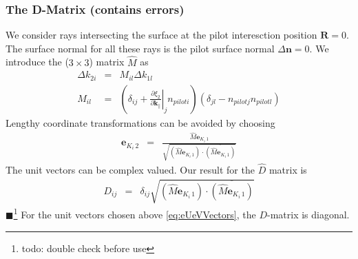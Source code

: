 \documentclass[12pt,a4paper,twoside,openright,BCOR10mm,headsepline,titlepage,abstracton,chapterprefix,final]{scrreprt}
\newcommand\Vector[1]{{\mathbf{#1}}}
\newcommand\wavenumber{k}
\newcommand\Wavevector{\Vector{\wavenumber}}
\newcommand{\remark}[1]{{\color{red}$\blacksquare$}\footnote{{\color{red}#1}}}
\begin{document}
\subsubsection{The D-Matrix (contains errors)}
We consider rays intersecting the surface at the pilot interesction position $\Vector{R} = 0$.
The surface normal for all these rays is the pilot surface normal $\Delta \Vector{n} = 0$.
We introduce the ($3\times3$) matrix $\hat{M}$ as
\begin{eqnarray}
 \Delta \wavenumber_{2i} &=& M_{il} \Delta \wavenumber_{1l} \\
 M_{il}
 &=& 
 \left( 
       \delta_{ij}
       + \left. \frac{\partial \xi_2}{\partial \Wavevector_{\parallel}} \right|_j n_{pilot i}
 \right) 
 ( \delta_{jl} -  n_{pilot j} n_{pilot l} )
\end{eqnarray}
Lengthy coordinate transformations can be avoided by choosing
\begin{eqnarray}
  \Vector{e}_{K_i\,2} &=& \frac{ \hat{M} \Vector{e}_{K_i\,1} }{\sqrt{ (\hat{M} \Vector{e}_{K_i\,1})\cdot \overline{(\hat{M} \Vector{e}_{K_i\,1})} }}
  \label{eq:eUeVVectors}
\end{eqnarray}
The unit vectors can be complex valued.
Our result for the $\hat{D}$ matrix is
\begin{eqnarray}
 D_{ij} &=&  \delta_{ij}
 \sqrt{ (\hat{M} \Vector{e}_{K_i\,1})\cdot \overline{(\hat{M} \Vector{e}_{K_i\,1})} } 
\end{eqnarray}
\remark{todo: double check before use}
For the unit vectors chosen above \eqref{eq:eUeVVectors}, the $D$-matrix is diagonal.
\end{document}
